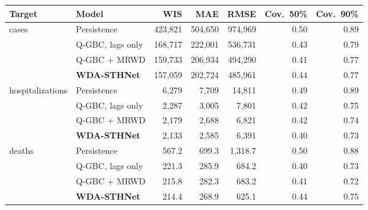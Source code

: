 \begin{tabular}{llrrrrr}
\toprule
Target & Model & WIS & MAE & RMSE & Cov.\ 50\% & Cov.\ 90\% \\
\midrule
cases & Persistence & 423,821 & 504,650 & 974,969 & 0.50 & 0.89 \\
 & Q-GBC, lags only & 168,717 & 222,001 & 536,731 & 0.43 & 0.79 \\
 & Q-GBC + MRWD & 159,733 & 206,934 & 494,290 & 0.41 & 0.77 \\
 & \textbf{WDA-STHNet} & 157,059 & 202,724 & 485,961 & 0.44 & 0.77 \\
\midrule
hospitalizations & Persistence & 6,279 & 7,709 & 14,811 & 0.49 & 0.89 \\
 & Q-GBC, lags only & 2,287 & 3,005 & 7,801 & 0.42 & 0.75 \\
 & Q-GBC + MRWD & 2,179 & 2,688 & 6,821 & 0.42 & 0.74 \\
 & \textbf{WDA-STHNet} & 2,133 & 2,585 & 6,391 & 0.40 & 0.73 \\
\midrule
deaths & Persistence & 567.2 & 699.3 & 1,318.7 & 0.50 & 0.88 \\
 & Q-GBC, lags only & 221.3 & 285.9 & 684.2 & 0.40 & 0.73 \\
 & Q-GBC + MRWD & 215.8 & 282.3 & 683.2 & 0.41 & 0.72 \\
 & \textbf{WDA-STHNet} & 214.4 & 268.9 & 625.1 & 0.44 & 0.75 \\
\bottomrule
\end{tabular}
